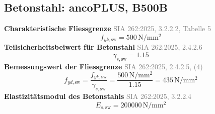 \documentclass[11pt,a4paper]{article}
\newcommand{\normref}[1]{{\small\textcolor{gray}{#1}}}
\begin{document}
\subsection{Betonstahl: ancoPLUS, B500B}
\noindent\textbf{Charakteristische Fliessgrenze} \hfill \normref{SIA 262:2025, 3.2.2.2, Tabelle 5}
\begin{equation*}
f_{yk,\text{sw}} = 500\,\mathrm{N}/\mathrm{mm}^{2}
\end{equation*}
\noindent\textbf{Teilsicherheitsbeiwert für Betonstahl} \hfill \normref{SIA 262:2025, 2.4.2.6}
\begin{equation*}
\gamma_{s,\text{sw}} = 1.15
\end{equation*}
\noindent\textbf{Bemessungswert der Fliessgrenze} \hfill \normref{SIA 262:2025, 2.4.2.5, (4)}
\begin{equation*}
f_{yd,\text{sw}} = \frac{f_{yk,\text{sw}}}{\gamma_{s,\text{sw}}} = \frac{500\,\mathrm{N}/\mathrm{mm}^{2}}{1.15} = 435\,\mathrm{N}/\mathrm{mm}^{2}
\end{equation*}
\noindent\textbf{Elastizitätsmodul des Betonstahls} \hfill \normref{SIA 262:2025, 3.2.2.4}
\begin{equation*}
E_{s,\text{sw}} = 200000\,\mathrm{N}/\mathrm{mm}^{2}
\end{equation*}
\end{document}
